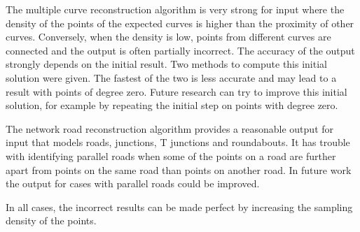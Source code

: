 \documentclass[11pt]{article}
\begin{document}
The multiple curve reconstruction algorithm is very strong for input where the density of the points of the expected curves is higher than the proximity of other curves. Conversely, when the density is low, points from different curves are connected and the output is often partially incorrect. The accuracy of the output strongly depends on the initial result. Two methods to compute this initial solution were given. The fastest of the two is less accurate and may lead to a result with points of degree zero. Future research can try to improve this initial solution, for example by repeating the initial step on points with degree zero.

The network road reconstruction algorithm provides a reasonable output for input that models roads, junctions, T junctions and roundabouts.
It has trouble with identifying parallel roads when some of the points on a road are further apart from points on the same road than points on another road. In future work the output for cases with parallel roads could be improved.

In all cases, the incorrect results can be made perfect by increasing the sampling density of the points.



\end{document}
